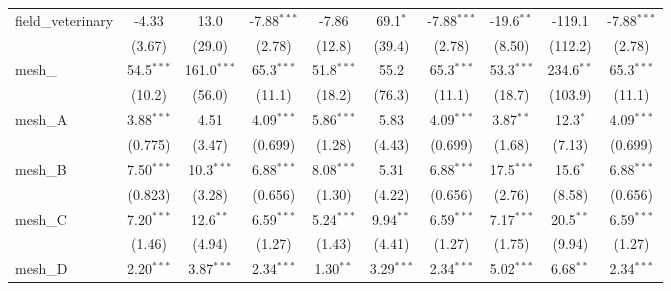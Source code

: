 \begin{tabular}{lccccccccc}
   field\_veterinary                                           & -4.33         & 13.0          & -7.88$^{***}$ & -7.86          & 69.1$^{*}$     & -7.88$^{***}$ & -19.6$^{**}$  & -119.1        & -7.88$^{***}$\\   
                                                               & (3.67)        & (29.0)        & (2.78)        & (12.8)         & (39.4)         & (2.78)        & (8.50)        & (112.2)       & (2.78)\\   
   mesh\_                                                      & 54.5$^{***}$  & 161.0$^{***}$ & 65.3$^{***}$  & 51.8$^{***}$   & 55.2           & 65.3$^{***}$  & 53.3$^{***}$  & 234.6$^{**}$  & 65.3$^{***}$\\   
                                                               & (10.2)        & (56.0)        & (11.1)        & (18.2)         & (76.3)         & (11.1)        & (18.7)        & (103.9)       & (11.1)\\   
   mesh\_A                                                     & 3.88$^{***}$  & 4.51          & 4.09$^{***}$  & 5.86$^{***}$   & 5.83           & 4.09$^{***}$  & 3.87$^{**}$   & 12.3$^{*}$    & 4.09$^{***}$\\   
                                                               & (0.775)       & (3.47)        & (0.699)       & (1.28)         & (4.43)         & (0.699)       & (1.68)        & (7.13)        & (0.699)\\   
   mesh\_B                                                     & 7.50$^{***}$  & 10.3$^{***}$  & 6.88$^{***}$  & 8.08$^{***}$   & 5.31           & 6.88$^{***}$  & 17.5$^{***}$  & 15.6$^{*}$    & 6.88$^{***}$\\   
                                                               & (0.823)       & (3.28)        & (0.656)       & (1.30)         & (4.22)         & (0.656)       & (2.76)        & (8.58)        & (0.656)\\   
   mesh\_C                                                     & 7.20$^{***}$  & 12.6$^{**}$   & 6.59$^{***}$  & 5.24$^{***}$   & 9.94$^{**}$    & 6.59$^{***}$  & 7.17$^{***}$  & 20.5$^{**}$   & 6.59$^{***}$\\   
                                                               & (1.46)        & (4.94)        & (1.27)        & (1.43)         & (4.41)         & (1.27)        & (1.75)        & (9.94)        & (1.27)\\   
   mesh\_D                                                     & 2.20$^{***}$  & 3.87$^{***}$  & 2.34$^{***}$  & 1.30$^{**}$    & 3.29$^{***}$   & 2.34$^{***}$  & 5.02$^{***}$  & 6.68$^{**}$   & 2.34$^{***}$\\   

\end{tabular}
